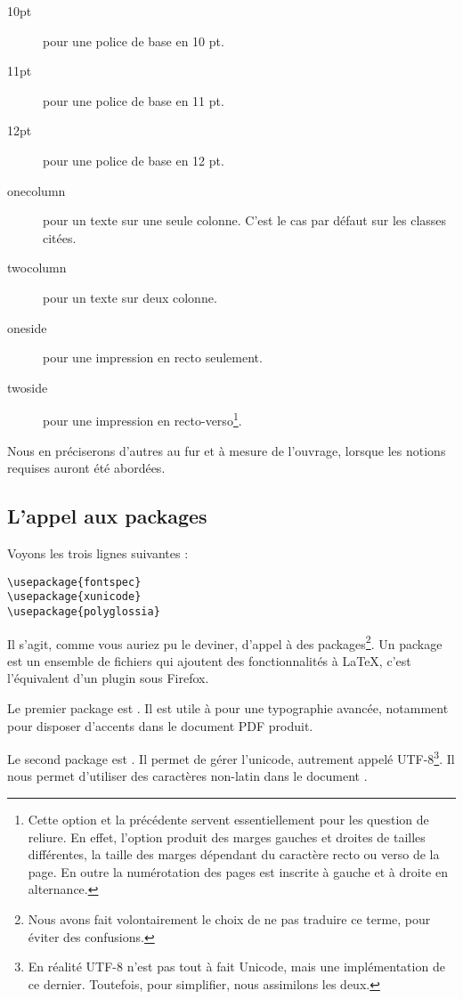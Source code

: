 \begin{description}
\item[10pt] pour une police de base en 10 pt.
\item[11pt] pour une police de base en 11 pt.
\item[12pt] pour une police de base en 12 pt.
\item[onecolumn] pour un texte sur une seule colonne. C'est le cas par défaut sur les classes citées.
\item[twocolumn] pour un texte sur deux colonne.
\item[oneside] pour une impression en recto seulement. \label{nbsides}
\item[twoside] pour une impression en recto-verso\footnote{Cette option et la précédente servent essentiellement pour les question de reliure. En effet, l'option  produit des marges gauches et droites de tailles différentes, la taille des marges dépendant du caractère recto ou verso de la page. En outre la numérotation des pages est inscrite à gauche et à droite  en alternance.}.\label{rectoverso}
\end{description}

Nous en préciserons d'autres au fur et à mesure de l'ouvrage, lorsque les notions requises auront été abordées.

\subsection{L'appel aux packages}

Voyons les trois lignes suivantes : 
\begin{verbatim}
\usepackage{fontspec}
\usepackage{xunicode}
\usepackage{polyglossia}
\end{verbatim}

Il s'agit, comme vous auriez pu le deviner, d'appel à des packages\footnote{Nous avons fait volontairement le choix de ne pas traduire ce terme, pour éviter des confusions.}. Un package est un ensemble de fichiers qui ajoutent des fonctionnalités à \LaTeX, c'est l'équivalent d'un plugin sous Firefox. 

Le premier package est . Il est utile à \XeLaTeX  pour une typographie avancée, notamment pour disposer d'accents dans le document PDF produit. 

Le second package est . Il permet de gérer l'unicode, autrement appelé UTF-8\footnote{En réalité UTF-8 n'est pas tout à fait Unicode, mais une implémentation de ce dernier. Toutefois, pour simplifier, nous assimilons les deux.}. Il nous permet d'utiliser des caractères non-latin dans le document .


